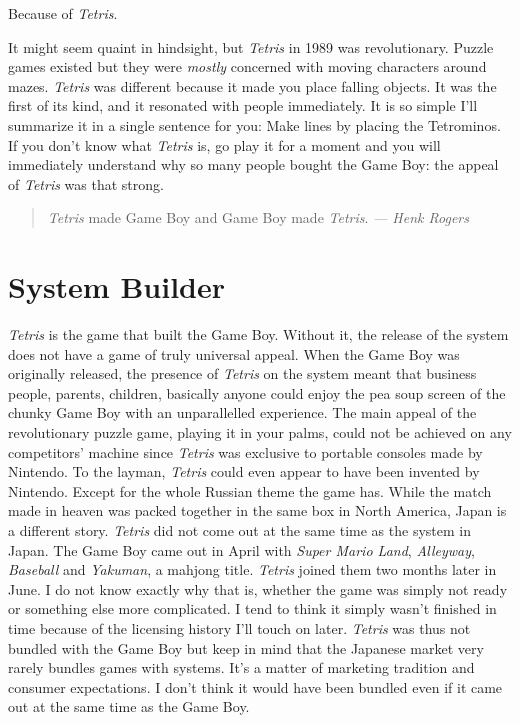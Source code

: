 \documentclass{book}
\begin{document}
Because of \emph{Tetris}.\par
It might seem quaint in hindsight, but \emph{Tetris} in 1989 was revolutionary. Puzzle games existed but they were \emph{mostly} concerned with moving characters around mazes. \emph{Tetris} was different because it made you place falling objects. It was the first of its kind, and it resonated with people immediately. It is so simple I’ll summarize it in a single sentence for you: Make lines by placing the Tetrominos. If you don’t know what \emph{Tetris} is, go play it for a moment and you will immediately understand why so many people bought the Game Boy: the appeal of \emph{Tetris} was that strong.\par
\begin{quote}\emph{Tetris} made Game Boy and Game Boy made \emph{Tetris}.\newline \emph{ — Henk Rogers}\end{quote} \par
\FloatBarrier\section*{System Builder}
\emph{Tetris} is the game that built the Game Boy. Without it, the release of the system does not have a game of truly universal appeal. When the Game Boy was originally released, the presence of \emph{Tetris} on the system meant that business people, parents, children, basically anyone could enjoy the pea soup screen of the chunky Game Boy with an unparallelled experience. The main appeal of the revolutionary puzzle game, playing it in your palms, could not be achieved on any competitors’ machine since \emph{Tetris} was exclusive to portable consoles made by Nintendo. To the layman, \emph{Tetris} could even appear to have been invented by Nintendo. Except for the whole Russian theme the game has. While the match made in heaven was packed together in the same box in North America, Japan is a different story. \emph{Tetris} did not come out at the same time as the system in Japan. The Game Boy came out in April with \emph{Super Mario Land}, \emph{Alleyway}, \emph{Baseball} and \emph{Yakuman}, a mahjong title. \emph{Tetris} joined them two months later in June. I do not know exactly why that is, whether the game was simply not ready or something else more complicated. I tend to think it simply wasn’t finished in time because of the licensing history I’ll touch on later. \emph{Tetris} was thus not bundled with the Game Boy but keep in mind that the Japanese market very rarely bundles games with systems. It’s a matter of marketing tradition and consumer expectations. I don’t think it would have been bundled even if it came out at the same time as the Game Boy.\par
\end{document}
